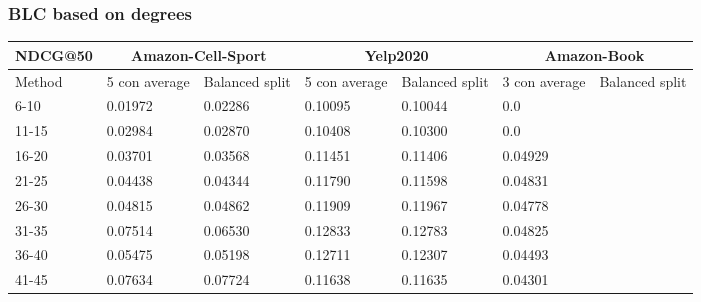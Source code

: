 \subsubsection{BLC based on degrees}


\begin{table*}[h!]
    \centering
    \begin{tabular}{|l|l|l||l|l||l|l|}
        \hline
        NDCG@50   & \multicolumn{2}{c||}{Amazon-Cell-Sport} & \multicolumn{2}{c||}{Yelp2020} & \multicolumn{2}{c|}{Amazon-Book}                                                   \\ \hline
        Method    & 5 con average                           & Balanced split                 & 5 con average                    & Balanced split & 3 con average & Balanced split \\ \hline
        6-10      & 0.01972                                 & 0.02286                        & 0.10095                          & 0.10044        & 0.0           &                \\ \hline
        11-15     & 0.02984                                 & 0.02870                        & 0.10408                          & 0.10300        & 0.0           &                \\ \hline
        16-20     & 0.03701                                 & 0.03568                        & 0.11451                          & 0.11406        & 0.04929       &                \\ \hline
        21-25     & 0.04438                                 & 0.04344                        & 0.11790                          & 0.11598        & 0.04831       &                \\ \hline
        26-30     & 0.04815                                 & 0.04862                        & 0.11909                          & 0.11967        & 0.04778       &                \\ \hline
        31-35     & 0.07514                                 & 0.06530                        & 0.12833                          & 0.12783        & 0.04825       &                \\ \hline
        36-40     & 0.05475                                 & 0.05198                        & 0.12711                          & 0.12307        & 0.04493       &                \\ \hline
        41-45     & 0.07634                                 & 0.07724                        & 0.11638                          & 0.11635        & 0.04301       &                \\ \hline

\end{tabular}
\end{table*}
